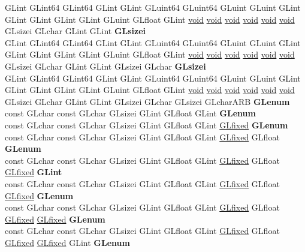 \begin{DoxyCompactItemize}
\begin{tabbing}
\>GLint GLint64 GLint64 GLint GLint GLuint64 GLuint64 GLuint GLuint GLint GLint GLint GLint GLint GLuint GLfloat GLint \hyperlink{interfacevoid}{void} \hyperlink{interfacevoid}{void} \hyperlink{interfacevoid}{void} \hyperlink{interfacevoid}{void} \hyperlink{interfacevoid}{void} \hyperlink{interfacevoid}{void} GLsizei GLchar GLint GLint {\bfseries GLsizei}\\
\>GLint GLint64 GLint64 GLint GLint GLuint64 GLuint64 GLuint GLuint GLint GLint GLint GLint GLint GLuint GLfloat GLint \hyperlink{interfacevoid}{void} \hyperlink{interfacevoid}{void} \hyperlink{interfacevoid}{void} \hyperlink{interfacevoid}{void} \hyperlink{interfacevoid}{void} \hyperlink{interfacevoid}{void} GLsizei GLchar GLint GLint GLsizei GLchar {\bfseries GLsizei}\\
\>GLint GLint64 GLint64 GLint GLint GLuint64 GLuint64 GLuint GLuint GLint GLint GLint GLint GLint GLuint GLfloat GLint \hyperlink{interfacevoid}{void} \hyperlink{interfacevoid}{void} \hyperlink{interfacevoid}{void} \hyperlink{interfacevoid}{void} \hyperlink{interfacevoid}{void} \hyperlink{interfacevoid}{void} GLsizei GLchar GLint GLint GLsizei GLchar GLsizei GLcharARB {\bfseries GLenum}\\
\>const GLchar const GLchar GLsizei GLint GLfloat GLint {\bfseries GLenum}\\
\>const GLchar const GLchar GLsizei GLint GLfloat GLint \hyperlink{glheader_8h_ad6d3fa892df40dedf48ee6d84529ae5e}{GLfixed} {\bfseries GLenum}\\
\>const GLchar const GLchar GLsizei GLint GLfloat GLint \hyperlink{glheader_8h_ad6d3fa892df40dedf48ee6d84529ae5e}{GLfixed} GLfloat {\bfseries GLenum}\\
\>const GLchar const GLchar GLsizei GLint GLfloat GLint \hyperlink{glheader_8h_ad6d3fa892df40dedf48ee6d84529ae5e}{GLfixed} GLfloat \hyperlink{glheader_8h_ad6d3fa892df40dedf48ee6d84529ae5e}{GLfixed} {\bfseries GLint}\\
\>const GLchar const GLchar GLsizei GLint GLfloat GLint \hyperlink{glheader_8h_ad6d3fa892df40dedf48ee6d84529ae5e}{GLfixed} GLfloat \hyperlink{glheader_8h_ad6d3fa892df40dedf48ee6d84529ae5e}{GLfixed} {\bfseries GLenum}\\
\>const GLchar const GLchar GLsizei GLint GLfloat GLint \hyperlink{glheader_8h_ad6d3fa892df40dedf48ee6d84529ae5e}{GLfixed} GLfloat \hyperlink{glheader_8h_ad6d3fa892df40dedf48ee6d84529ae5e}{GLfixed} \hyperlink{glheader_8h_ad6d3fa892df40dedf48ee6d84529ae5e}{GLfixed} {\bfseries GLenum}\\
\>const GLchar const GLchar GLsizei GLint GLfloat GLint \hyperlink{glheader_8h_ad6d3fa892df40dedf48ee6d84529ae5e}{GLfixed} GLfloat \hyperlink{glheader_8h_ad6d3fa892df40dedf48ee6d84529ae5e}{GLfixed} \hyperlink{glheader_8h_ad6d3fa892df40dedf48ee6d84529ae5e}{GLfixed} GLint {\bfseries GLenum}\\

\end{tabbing}
\end{DoxyCompactItemize}
